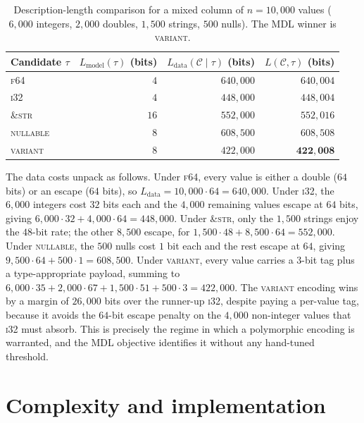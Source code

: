 \documentclass[10pt]{article}
\theoremstyle{definition}
\theoremstyle{remark}
\newcommand{\Ccal}{\mathcal{C}}
\newcommand{\Lmodel}{L_{\mathrm{model}}}
\newcommand{\Ldata}{L_{\mathrm{data}}}
\begin{document}
\begin{table}[h]
\centering
\caption{Description-length comparison for a mixed column of $n = 10{,}000$
values ($6{,}000$ integers, $2{,}000$ doubles, $1{,}500$ strings, $500$
nulls). The MDL winner is \textsc{variant}.}\label{tab:worked}
\begin{tabular}{@{}lrrr@{}}
\toprule
Candidate $\tau$ & $\Lmodel(\tau)$ (bits) & $\Ldata(\Ccal \mid \tau)$ (bits) & $L(\Ccal, \tau)$ (bits) \\
\midrule
\textsc{f64}            & $4$  & $640{,}000$ & $640{,}004$ \\
\textsc{i32}            & $4$  & $448{,}000$ & $448{,}004$ \\
\textsc{\&str}          & $16$ & $552{,}000$ & $552{,}016$ \\
\textsc{nullable}       & $8$  & $608{,}500$ & $608{,}508$ \\
\textsc{variant}        & $8$  & $422{,}000$ & $\mathbf{422{,}008}$ \\
\bottomrule
\end{tabular}
\end{table}

The data costs unpack as follows. Under \textsc{f64}, every value is
either a double ($64$ bits) or an escape ($64$ bits), so $\Ldata =
10{,}000 \cdot 64 = 640{,}000$. Under \textsc{i32}, the $6{,}000$ integers
cost $32$ bits each and the $4{,}000$ remaining values escape at $64$
bits, giving $6{,}000 \cdot 32 + 4{,}000 \cdot 64 = 448{,}000$. Under
\textsc{\&str}, only the $1{,}500$ strings enjoy the $48$-bit rate; the
other $8{,}500$ escape, for $1{,}500 \cdot 48 + 8{,}500 \cdot 64 =
552{,}000$. Under \textsc{nullable}, the $500$ nulls cost $1$ bit each and
the rest escape at $64$, giving $9{,}500 \cdot 64 + 500 \cdot 1 =
608{,}500$. Under \textsc{variant}, every value carries a $3$-bit tag plus
a type-appropriate payload, summing to $6{,}000 \cdot 35 + 2{,}000 \cdot 67
+ 1{,}500 \cdot 51 + 500 \cdot 3 = 422{,}000$. The \textsc{variant}
encoding wins by a margin of $26{,}000$ bits over the runner-up
\textsc{i32}, despite paying a per-value tag, because it avoids the
$64$-bit escape penalty on the $4{,}000$ non-integer values that
\textsc{i32} must absorb. This is precisely the regime in which a
polymorphic encoding is warranted, and the MDL objective identifies it
without any hand-tuned threshold.

\section{Complexity and implementation}\label{sec:impl}
\end{document}
